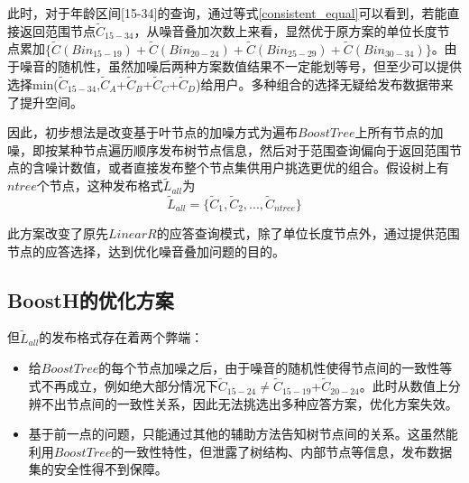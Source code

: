 此时，对于年龄区间[15-34]的查询，通过等式\ref{consistent_equal}可以看到，若能直接返回范围节点{$\widetilde{C}_{15-34}$}，从噪音叠加次数上来看，显然优于原方案的单位长度节点累加$\{\tilde{C}(Bin_{15-19})+\tilde{C}(Bin_{20-24})+\tilde{C}(Bin_{25-29})+\tilde{C}(Bin_{30-34})\}$。由于噪音的随机性，虽然加噪后两种方案数值结果不一定能划等号，但至少可以提供选择min({$\tilde{C}_{15-34}$},{$\tilde{C}_{A}$}+{$\tilde{C}_{B}$}+{$\tilde{C}_{C}$}+{$\tilde{C}_{D}$})给用户。多种组合的选择无疑给发布数据带来了提升空间。

因此，初步想法是改变基于叶节点的加噪方式为遍布$BoostTree$上所有节点的加噪，即按某种节点遍历顺序发布树节点信息，然后对于范围查询偏向于返回范围节点的含噪计数值，或者直接发布整个节点集供用户挑选更优的组合。假设树上有$ntree$个节点，这种发布格式$\tilde{L}_{all}$为
\begin{equation}
\label{L_allnodes}
\tilde{L}_{all} = \{\tilde{C}_{1},\tilde{C}_{2},...,\tilde{C}_{ntree}\}
\end{equation}

此方案改变了原先$LinearR$的应答查询模式，除了单位长度节点外，通过提供范围节点的应答选择，达到优化噪音叠加问题的目的。

\subsection{BoostH的优化方案}
\label{BoostH}

但$\tilde{L}_{all}$的发布格式存在着两个弊端：
\begin{itemize}
	\item 给$BoostTree$的每个节点加噪之后，由于噪音的随机性使得节点间的一致性等式不再成立，例如绝大部分情况下{$\tilde{C}_{15-24}$}$ \neq ${$\tilde{C}_{15-19}$}+{$\tilde{C}_{20-24}$}。此时从数值上分辨不出节点间的一致性关系，因此无法挑选出多种应答方案，优化方案失效。
	\item 基于前一点的问题，只能通过其他的辅助方法告知树节点间的关系。这虽然能利用$BoostTree$的一致性特性，但泄露了树结构、内部节点等信息，发布数据集的安全性得不到保障。
\end{itemize}

